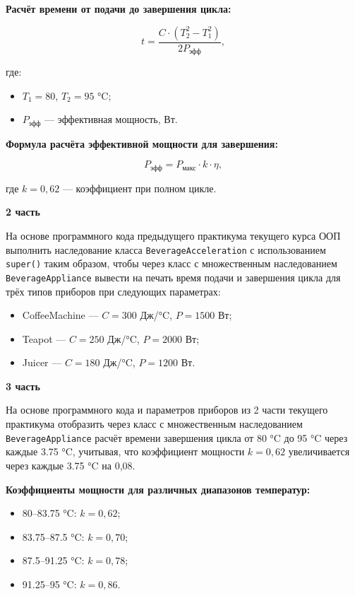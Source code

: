 \begin{enumerate}
\textbf{Расчёт времени от подачи до завершения цикла:}

\begin{equation}
t = \frac{C \cdot (T_2^2 - T_1^2)}{2P_{\text{эфф}}},
\end{equation}

где:  
\begin{itemize}
    \item $T_1 = 80$, $T_2 = 95$ °C;  
    \item $P_{\text{эфф}}$ — эффективная мощность, Вт.  
\end{itemize}

\textbf{Формула расчёта эффективной мощности для завершения:}

\begin{equation}
P_{\text{эфф}} = P_{\text{макс}} \cdot k \cdot \eta,
\end{equation}

где $k = 0{,}62$ — коэффициент при полном цикле.

\textbf{2 часть}

На основе программного кода предыдущего практикума текущего курса ООП выполнить наследование класса \texttt{BeverageAcceleration} с использованием \texttt{super()} таким образом, чтобы через класс с множественным наследованием \texttt{BeverageAppliance} вывести на печать время подачи и завершения цикла для трёх типов приборов при следующих параметрах:

\begin{itemize}
    \item CoffeeMachine — $C = 300$ Дж/°C, $P = 1500$ Вт;  
    \item Teapot — $C = 250$ Дж/°C, $P = 2000$ Вт;  
    \item Juicer — $C = 180$ Дж/°C, $P = 1200$ Вт.  
\end{itemize}

\textbf{3 часть}

На основе программного кода и параметров приборов из 2 части текущего практикума отобразить через класс с множественным наследованием \texttt{BeverageAppliance} расчёт времени завершения цикла от 80 °C до 95 °C через каждые 3.75 °C, учитывая, что коэффициент мощности $k = 0{,}62$ увеличивается через каждые 3.75 °C на 0{,}08.

\textbf{Коэффициенты мощности для различных диапазонов температур:}
\begin{itemize}
    \item 80–83.75 °C: $k = 0{,}62$;  
    \item 83.75–87.5 °C: $k = 0{,}70$;  
    \item 87.5–91.25 °C: $k = 0{,}78$;  
    \item 91.25–95 °C: $k = 0{,}86$.  
\end{itemize}

\end{enumerate}
